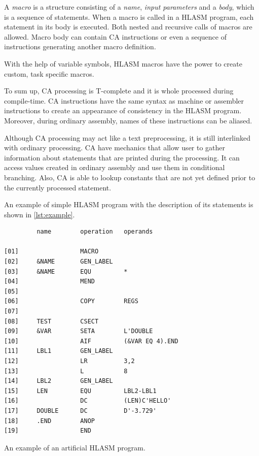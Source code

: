 A \emph{macro} is a structure consisting of a \emph{name}, \emph{input parameters} and a \emph{body}, which is a sequence of statements. When a macro is called in a HLASM program, each statement in its body is executed. Both nested and recursive calls of macros are allowed. Macro body can contain CA instructions or even a sequence of instructions generating another macro definition.

With the help of variable symbols, HLASM macros have the power to create custom, task specific macros.

\vspace{5mm}

To sum up, CA processing is T-complete and it is whole processed during compile-time.
CA instructions have the same syntax as machine or assembler instructions to create an appearance of consistency in the HLASM program. Moreover, during ordinary assembly, names of these instructions can be aliased.

Although CA processing may act like a text preprocessing, it is still interlinked with ordinary processing. CA have mechanics that allow user to gather information about statements that are printed during the processing. It can access values created in ordinary assembly and use them in conditional branching. Also, CA is able to lookup constants that are not yet defined prior to the currently processed statement. 


\vspace{5mm}


An example of simple HLASM program with the description of its statements is shown in \cref{lst:example}.
\begin{listing}
\begin{verbatim}
         name        operation   operands
         
[01]                 MACRO                   
[02]     &NAME       GEN_LABEL
[03]     &NAME       EQU         *
[04]                 MEND
[05]             
[06]                 COPY        REGS
[07]             
[08]     TEST        CSECT
[09]     &VAR        SETA        L'DOUBLE
[10]                 AIF         (&VAR EQ 4).END
[11]     LBL1        GEN_LABEL
[12]                 LR          3,2
[13]                 L           8
[14]     LBL2        GEN_LABEL
[15]     LEN         EQU         LBL2-LBL1
[16]                 DC          (LEN)C'HELLO'
[17]     DOUBLE      DC          D'-3.729'
[18]     .END        ANOP
[19]                 END
\end{verbatim} 
\caption{An example of an artificial HLASM program.}
\label{lst:example}
\end{listing}

